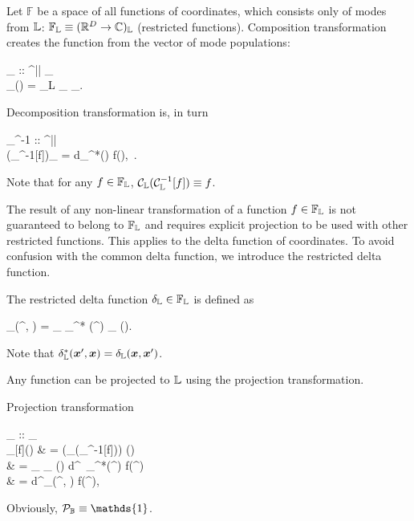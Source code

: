 \begin{definition}
	Let $\mathbb{F}$ be a space of all functions of coordinates, which consists only of modes from $\mathbb{L}$: $\mathbb{F}_{\mathbb{L}} \equiv (\mathbb{R}^D \rightarrow \mathbb{C})_{\mathbb{L}}$ (restricted functions).
	Composition transformation creates the function from the vector of mode populations:
	\begin{eqn*}
		_{\restbasis} :: ^{|\restbasis|} \rightarrow {}_{\restbasis} \\
		_{\restbasis}(\balpha) = \sum_{\nvec \in L} \phi_{\nvec} \alpha_{\nvec}.
	\end{eqn*}
	Decomposition transformation is, in turn
	\begin{eqn*}
		_{\restbasis}^{-1} ::  \rightarrow {}^{|\restbasis|} \\
		(_{\restbasis}^{-1}[f])_{\nvec}
		= \int d\xvec \phi_{\nvec}^*(\xvec) f(\xvec),\,{\nvec} \in \restbasis.
	\end{eqn*}
	Note that for any $f \in \mathbb{F}_{\mathbb{L}}$, $\mathcal{C}_{\mathbb{L}}(\mathcal{C}_{\mathbb{L}}^{-1}[f]) \equiv f$.
\end{definition}

The result of any non-linear transformation of a function $f \in \mathbb{F}_{\mathbb{L}}$ is not guaranteed to belong to $\mathbb{F}_{\mathbb{L}}$ and requires explicit projection to be used with other restricted functions.
This applies to the delta function of coordinates.
To avoid confusion with the common delta function, we introduce the restricted delta function.

\begin{definition}
\label{def:func-calculus:restricted-delta}
	The restricted delta function $\delta_{\mathbb{L}} \in \mathbb{F}_{\mathbb{L}}$ is defined as
	\begin{eqn*}
		\delta_{\restbasis}(\xvec^\prime, \xvec)
		= \sum_{\nvec \in \restbasis} \phi_{\nvec}^* (\xvec^\prime) \phi_{\nvec} (\xvec).
	\end{eqn*}
	Note that $\delta_{\mathbb{L}}^*(\boldsymbol{x}^\prime, \boldsymbol{x}) = \delta_{\mathbb{L}}(\boldsymbol{x}, \boldsymbol{x}^\prime)$.
\end{definition}

Any function can be projected to $\mathbb{L}$ using the projection transformation.

\begin{definition}
\label{def:func-calculus:projector}
	Projection transformation
	\begin{eqn*}
		_{\restbasis} ::
		 \rightarrow {}_{\restbasis} \\
		_{\restbasis}[f](\xvec)
		& = (_{\restbasis}(_{\restbasis}^{-1}[f])) (\xvec) \\
		& = \sum_{\nvec \in \restbasis} \phi_{\nvec} (\xvec) \int
			d\xvec^\prime\, \phi_{\nvec}^*(\xvec^\prime) f(\xvec^\prime) \\
		& = \int d\xvec^\prime \delta_{\restbasis}(\xvec^\prime, \xvec) f(\xvec^\prime),
	\end{eqn*}
	Obviously, $\mathcal{P}_{\fullbasis} \equiv \mathds{1}$.
\end{definition}


